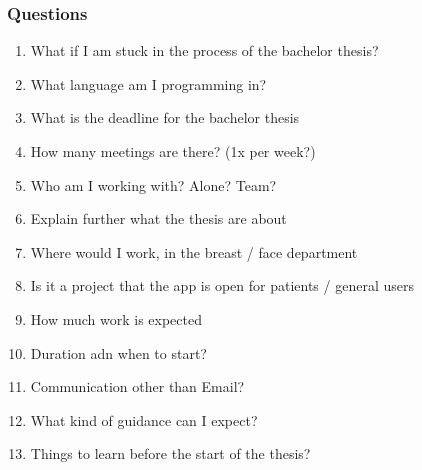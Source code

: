 \documentclass{article}
\begin{document}
\subsubsection*{Questions}

\begin{enumerate}[label=\textbf{\arabic*.}]
    \item What if I am stuck in the process of the bachelor thesis?
    \item What language am I programming in?
    \item What is the deadline for the bachelor thesis
    \item How many meetings are there? (1x per week?)
    \item Who am I working with? Alone? Team?
    \item Explain further what the thesis are about
    \item Where would I work, in the breast / face department
    \item Is it a project that the app is open for patients / general users
    \item How much work is expected
    \item Duration adn when to start?
    \item Communication other than Email?
    \item What kind of guidance can I expect?
    \item Things to learn before the start of the thesis?







\end{enumerate}
\end{document}
